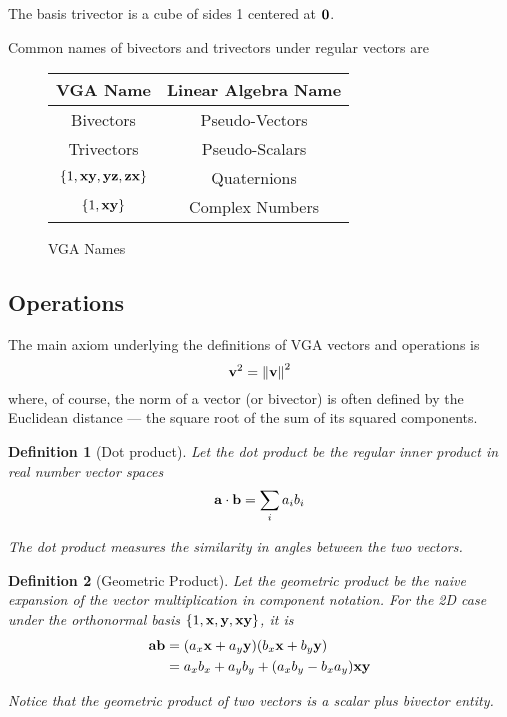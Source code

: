 \documentclass{article}
\newtheorem{defi}{Definition}[section]
\begin{document}
The basis trivector is a cube of sides 1 centered at $\vb 0$.

Common names of bivectors and trivectors under regular vectors are
\begin{figure}[H]
    \centering
    \begin{tabular}{|c|c|}
        \hline
        VGA Name & Linear Algebra Name \\
        \hline
        Bivectors & Pseudo-Vectors \\
        \hline
        Trivectors & Pseudo-Scalars \\
        \hline
        $\{1, \vb{xy}, \vb{yz}, \vb{zx}\}$ & Quaternions\\
        \hline
        $\{1, \vb{xy}\}$ & Complex Numbers\\
        \hline
    \end{tabular}
    \caption{VGA Names}
\end{figure}

\subsection{Operations}
The main axiom underlying the definitions of VGA vectors and operations is
\[
    \vb v^2 = \norm{\vb v}^2
\]
where, of course, the norm of a vector (or bivector) is often defined by the Euclidean distance --- the square root of the sum of its squared components.

\begin{defi}[Dot product]
    Let the dot product be the regular inner product in real number vector spaces
    \[
        \vb a \cdot \vb b = \sum_i a_i b_i
    \]

    The dot product measures the similarity in angles between the two vectors.
\end{defi}

\begin{defi}[Geometric Product]
    Let the geometric product be the naive expansion of the vector multiplication in component notation. For the 2D case under the orthonormal basis $\{1, \vb x, \vb y, \vb {xy}\}$, it is
    \begin{align*}
        \vb a \vb b &= (a_x \vb x + a_y \vb y) (b_x \vb x + b_y \vb y)\\
        &= a_x b_x + a_y b_y + (a_x b_y - b_x a_y) \vb{xy}
    \end{align*}

    Notice that the geometric product of two vectors is a scalar plus bivector entity.
\end{defi}
\end{document}
